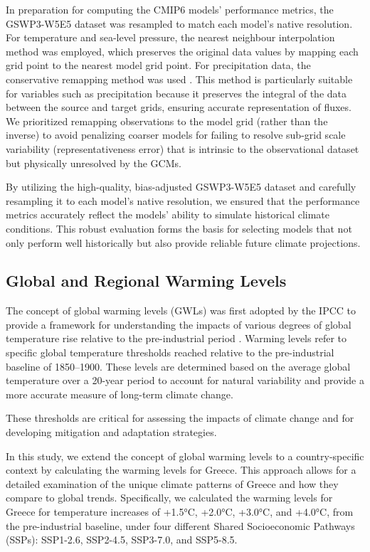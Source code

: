 \documentclass[pdflatex,sn-chicago]{sn-jnl}%
\theoremstyle{thmstyleone}%
\theoremstyle{thmstyletwo}%
\theoremstyle{thmstylethree}%
\begin{document}
In preparation for computing the CMIP6 models’ performance metrics, the GSWP3-W5E5 dataset was resampled to match each model’s native resolution. For temperature and sea-level pressure, the nearest neighbour interpolation method was employed, which preserves the original data values by mapping each grid point to the nearest model grid point. For precipitation data, the conservative remapping method was used \citep{Jones-1999}. This method is particularly suitable for variables such as precipitation because it preserves the integral of the data between the source and target grids, ensuring accurate representation of fluxes. We prioritized remapping observations to the model grid (rather than the inverse) to avoid penalizing coarser models for failing to resolve sub-grid scale variability (representativeness error) that is intrinsic to the observational dataset but physically unresolved by the GCMs.

By utilizing the high-quality, bias-adjusted GSWP3-W5E5 dataset and carefully resampling it to each model’s native resolution, we ensured that the performance metrics accurately reflect the models’ ability to simulate historical climate conditions. This robust evaluation forms the basis for selecting models that not only perform well historically but also provide reliable future climate projections.


\subsection{Global and Regional Warming Levels}
The concept of global warming levels (GWLs) was first adopted by the IPCC to provide a framework for understanding the impacts of various degrees of global temperature rise relative to the pre-industrial period  \citep{IPCC_2018_SR15}. Warming levels refer to specific global temperature thresholds reached relative to the pre-industrial baseline of 1850--1900. These levels are determined based on the average global temperature over a 20-year period to account for natural variability and provide a more accurate measure of long-term climate change.

These thresholds are critical for assessing the impacts of climate change and for developing mitigation and adaptation strategies.

In this study, we extend the concept of global warming levels to a country-specific context by calculating the warming levels for Greece. This approach allows for a detailed examination of the unique climate patterns of Greece and how they compare to global trends. Specifically, we calculated the warming levels for Greece for temperature increases of +1.5°C, +2.0°C, +3.0°C, and +4.0°C, from the pre-industrial baseline, under four different Shared Socioeconomic Pathways (SSPs): SSP1-2.6, SSP2-4.5, SSP3-7.0, and SSP5-8.5.
\end{document}
